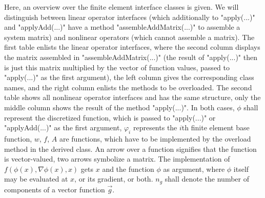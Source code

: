 Here, an overview over the finite element interface classes is given.
We will distinguish between linear operator interfaces (which additionally
to "apply(...)" and "applyAdd(...)" have a method "assembleAddMatrix(...)" to assemble a system matrix)
and nonlinear operators (which cannot assemble a matrix).
The first table enlists the linear operator interfaces, where the second column displays the matrix assembled in "assembleAddMatrix(...)"
(the result of "apply(...)" then is just this matrix multiplied by the vector of function values, passed to "apply(...)" as the first argument),
the left column gives the corresponding class names, and the right column enlists the methods to be overloaded.
The second table shows all nonlinear operator interfaces and has the same structure, only the middle column shows the result of the method "apply(...)".
In both cases, $\phi$ shall represent the discretized function, which is passed to "apply(...)" or "applyAdd(...)" as the first argument,
$\varphi_i$ represents the $i$th finite element base function, $w$, $f$, $A$ are functions, which have to be implemented by the overload method
in the derived class. An arrow over a function signifies that the function is vector-valued, two arrows
symbolize a matrix. The implementation of $f\left(\phi(x),\nabla\phi(x),x\right)$ gets $x$ and the function $\phi$ as argument, where $\phi$
itself may be evaluated at $x$, or its gradient, or both. $n_g$ shall denote the number of components of a vector function $\vec g$.

